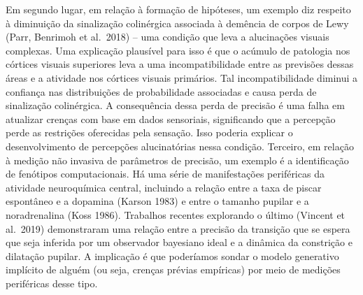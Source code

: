 \documentclass[
  12pt,
]{book}
\begin{document}
Em segundo lugar, em relação à formação de hipóteses, um exemplo diz respeito à diminuição da sinalização colinérgica associada à demência de corpos de Lewy (Parr, Benrimoh et al.~2018) -- uma condição que leva a alucinações visuais complexas. Uma explicação plausível para isso é que o acúmulo de patologia nos córtices visuais superiores leva a uma incompatibilidade entre as previsões dessas áreas e a atividade nos córtices visuais primários. Tal incompatibilidade diminui a confiança nas distribuições de probabilidade associadas e causa perda de sinalização colinérgica. A consequência dessa perda de precisão é uma falha em atualizar crenças com base em dados sensoriais, significando que a percepção perde as restrições oferecidas pela sensação. Isso poderia explicar o desenvolvimento de percepções alucinatórias nessa condição. Terceiro, em relação à medição não invasiva de parâmetros de precisão, um exemplo é a identificação de fenótipos computacionais. Há uma série de manifestações periféricas da atividade neuroquímica central, incluindo a relação entre a taxa de piscar espontâneo e a dopamina (Karson 1983) e entre o tamanho pupilar e a noradrenalina (Koss 1986). Trabalhos recentes explorando o último (Vincent et al.~2019) demonstraram uma relação entre a precisão da transição que se espera que seja inferida por um observador bayesiano ideal e a dinâmica da constrição e dilatação pupilar. A implicação é que poderíamos sondar o modelo generativo implícito de alguém (ou seja, crenças prévias empíricas) por meio de medições periféricas desse tipo.
\end{document}

